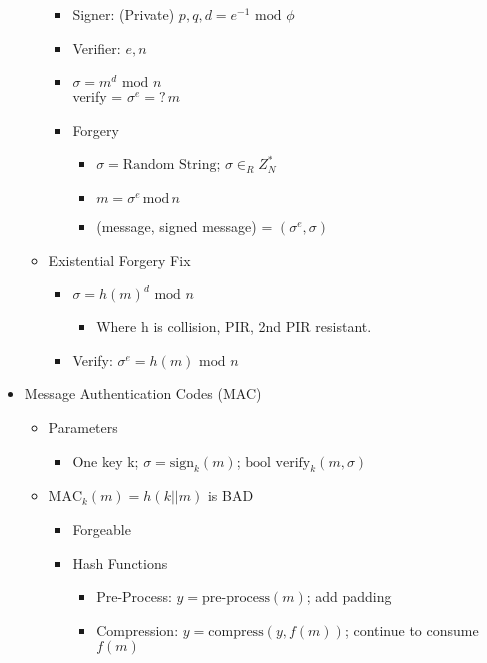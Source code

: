 \begin{itemize}
\begin{itemize}
\begin{itemize}
        \item Signer: (Private) $p, q, d = e^{-1} \text{ mod } \phi$
        \item Verifier: $e,n$
        \item $\sigma = m^d \text{ mod } n$
        \\verify = $\sigma^e =?\,m$
        \item Forgery
            \begin{itemize}
            \item $\sigma = \text{Random String}$; $\sigma \in_R Z_N^*$
            \item $m = \sigma^e\,\text{mod}\,n$
            \item (message, signed message) = $(\sigma^e, \sigma)$
            \end{itemize}
        \end{itemize}
    \item Existential Forgery Fix
        \begin{itemize}
        \item $\sigma = h(m)^d \text{ mod } n$
            \begin{itemize}
            \item Where h is collision, PIR, 2nd PIR resistant. 
            \end{itemize}
        \item Verify: $\sigma^e = h(m) \text{ mod } n$
        \end{itemize}
    \end{itemize}
\item Message Authentication Codes (MAC)  
\begin{itemize}  
    \item Parameters  
    \begin{itemize}  
        \item One key k; $\sigma = \text{sign}_k(m)$; $\text{bool verify}_k(m,\sigma)$ 
    \end{itemize}  
    \item $\text{MAC}_k(m) = h(k||m)$ is BAD  
        \begin{itemize}  
        \item Forgeable  
        \item Hash Functions 
            \begin{itemize} 
            \item Pre-Process: $y = \text{pre-process}(m)$; add padding         \item Compression: $y = \text{compress}(y, f(m))$; continue to consume $f(m)$  

\end{itemize}
\end{itemize}
\end{itemize}
\end{itemize}
